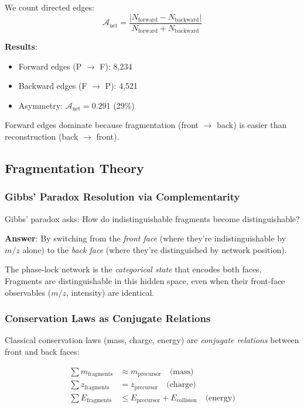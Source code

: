 \documentclass[twocolumn,10pt,a4paper]{article}
\theoremstyle{definition}
\theoremstyle{remark}
\begin{document}
We count directed edges:
\begin{equation}
\mathcal{A}_{\text{net}} = \frac{|N_{\text{forward}} - N_{\text{backward}}|}{N_{\text{forward}} + N_{\text{backward}}}
\end{equation}

\textbf{Results}:
\begin{itemize}
\item Forward edges (P $\to$ F): 8,234
\item Backward edges (F $\to$ P): 4,521
\item Asymmetry: $\mathcal{A}_{\text{net}} = 0.291$ (29\%)
\end{itemize}

Forward edges dominate because fragmentation (front $\to$ back) is easier than reconstruction (back $\to$ front).

\subsection{Fragmentation Theory}

\subsubsection{Gibbs' Paradox Resolution via Complementarity}

Gibbs' paradox asks: How do indistinguishable fragments become distinguishable?

\textbf{Answer}: By switching from the \emph{front face} (where they're indistinguishable by $m/z$ alone) to the \emph{back face} (where they're distinguished by network position).

The phase-lock network is the \emph{categorical state} that encodes both faces. Fragments are distinguishable in this hidden space, even when their front-face observables ($m/z$, intensity) are identical.

\subsubsection{Conservation Laws as Conjugate Relations}

Classical conservation laws (mass, charge, energy) are \emph{conjugate relations} between front and back faces:

\begin{align}
\sum m_{\text{fragments}} &\approx m_{\text{precursor}} \quad \text{(mass)} \\
\sum z_{\text{fragments}} &= z_{\text{precursor}} \quad \text{(charge)} \\
\sum E_{\text{fragments}} &\leq E_{\text{precursor}} + E_{\text{collision}} \quad \text{(energy)}
\end{align}
\end{document}
